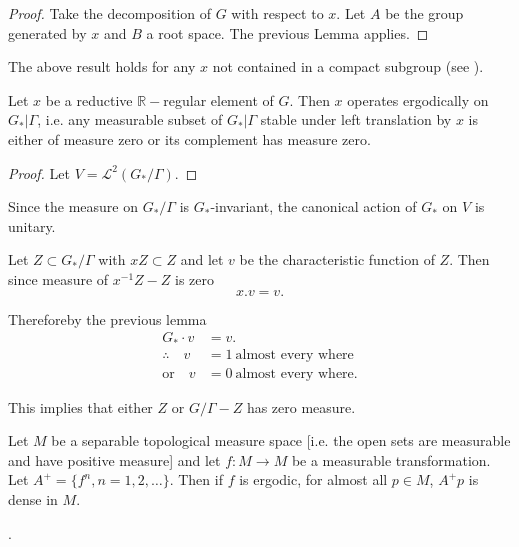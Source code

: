 \begin{proof}
  Take the decomposition of $G$ with respect to $x$. Let $A$ be the
  group generated by $x$ and $B$ a root space. The previous Lemma applies.
\end{proof}

\begin{remark*}
  The above result holds for any $x$ not contained in a compact
  subgroup (see \cite{11}).
\end{remark*}

\begin{thm} \label{chap5:thm5.3}
  Let $x$ be a reductive $\mathbb{R}-$regular element of $G$. Then $x$
  operates ergodically on $G_* \big| \Gamma$, i.e. any measurable
  subset of $G_*\big| \Gamma$ stable under left translation by $x$ is
  either of measure zero or its complement has measure zero.
\end{thm}

\begin{proof}
  Let \quad $V= \mathscr{L}^2 (G_*/ \Gamma)$.
\end{proof}

Since the measure on $G_*/\Gamma$ is $G_*$-invariant, the canonical
action of $G_*$ on $V$ is unitary.

Let $Z\subset G_* /\Gamma$ with $x Z \subset Z$ and let $v$ be the
characteristic function of $Z$. Then since measure of $x^{-1}Z-Z$ is
zero
$$
x. v =v.
$$

Therefore\pageoriginale by the previous lemma
\begin{align*}
  G_* \cdot v & = v.\\
  \therefore \quad v & = 1 ~\text{almost every where}\\
  \text{or}\quad v & = 0 ~\text{almost every where}.
\end{align*}

This implies that either $Z$ or $G/\Gamma-Z$ has zero measure.

\begin{remark*}
  Let $M$ be a separable topological measure space [i.e. the open sets
  are measurable and have positive measure] and let $f:M \to M$ be a
  measurable transformation. Let $A^+ = \{ f^n, n =1,2, \ldots
  \}$. Then if $f$ is ergodic, for almost all $p \in M$, $A^+ p$ is
  dense in $M$.
\end{remark*}

\medskip
\noindent[\textit{Proof}: 
    Let $\{ U_i\} $ be a denumerable base of open sets. Let $\{ W_i =
    p|p \in M, A^+ p \cap U_i = \phi\}$ then $W_i$ is
    measurable. Also $p \in W_i \Rightarrow fp \in W_i$ therefore $f
    W_i \subset W_i$. Since $f$ is ergodic and $U_i \subset M - W_i,
    W_i$ is of measure zero.
    $$
    \therefore \quad E = \bigcup^\infty_{i=1} W_i \quad \text{has
      measure 0}
    $$
    $p \notin E$ implies $A^+ p \cap U_i \neq \phi ~\forall i$ and this
    proves that for almost all $p \in M$, $A^+ p$ is dense].

